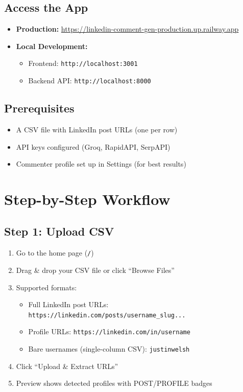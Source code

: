 \documentclass[12pt,a4paper]{article}
\begin{document}
\subsection{Access the App}

\begin{itemize}[leftmargin=1.5em]
    \item \textbf{Production:} \url{https://linkedin-comment-gen-production.up.railway.app}
    \item \textbf{Local Development:}
    \begin{itemize}
        \item Frontend: \texttt{http://localhost:3001}
        \item Backend API: \texttt{http://localhost:8000}
    \end{itemize}
\end{itemize}

\subsection{Prerequisites}
\begin{itemize}[leftmargin=1.5em]
    \item A CSV file with LinkedIn post URLs (one per row)
    \item API keys configured (Groq, RapidAPI, SerpAPI)
    \item Commenter profile set up in Settings (for best results)
\end{itemize}

\section{Step-by-Step Workflow}

\subsection{Step 1: Upload CSV}
\begin{enumerate}[leftmargin=1.5em]
    \item Go to the home page (\texttt{/})
    \item Drag \& drop your CSV file or click ``Browse Files''
    \item Supported formats:
    \begin{itemize}
        \item Full LinkedIn post URLs: \texttt{https://linkedin.com/posts/username\_slug...}
        \item Profile URLs: \texttt{https://linkedin.com/in/username}
        \item Bare usernames (single-column CSV): \texttt{justinwelsh}
    \end{itemize}
    \item Click ``Upload \& Extract URLs''
    \item Preview shows detected profiles with POST/PROFILE badges
\end{enumerate}
\end{document}
